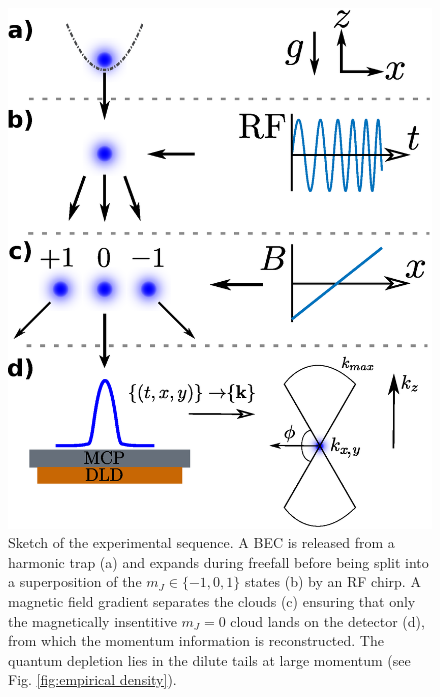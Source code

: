 	\begin{figure}
	    \begin{minipage}{0.4\textwidth}
	    \vspace{0cm}
	    \caption{Sketch of the experimental sequence. A BEC is released from a harmonic trap %
	    (a) and expands during freefall before being split into a superposition of the $m_J\in\{-1,0,1\}$ states (b) by an RF chirp. A magnetic field gradient separates the clouds (c) ensuring that only the magnetically insentitive $m_J=0$ cloud lands on the detector (d), from which the momentum information is reconstructed. The quantum depletion lies in the dilute tails at large momentum (see Fig. \ref{fig:empirical density}).}
	    \label{fig:sequence}
	    \end{minipage}
	    \hfill
		\begin{minipage}{0.55\textwidth}
		\vspace{0cm}
	    \includegraphics[width=\textwidth]{fig/QD/exp_cartoon.eps}
	    \end{minipage}
	\end{figure}

